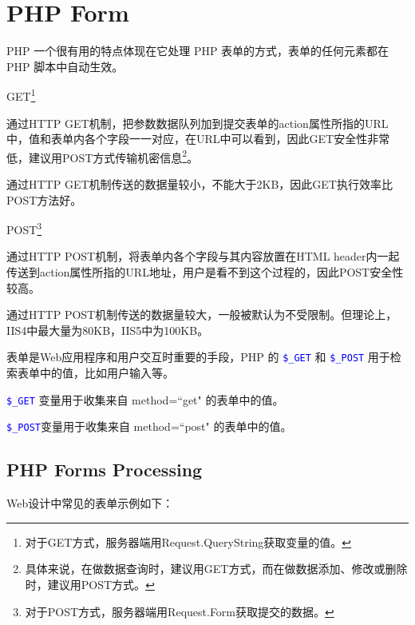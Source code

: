 \part{PHP Form}

PHP 一个很有用的特点体现在它处理 PHP 表单的方式，表单的任何元素都在 PHP 脚本中自动生效。


\begin{compactitem}
\item GET\footnote{对于GET方式，服务器端用Request.QueryString获取变量的值。}

通过HTTP GET机制，把参数数据队列加到提交表单的action属性所指的URL中，值和表单内各个字段一一对应，在URL中可以看到，因此GET安全性非常低，建议用POST方式传输机密信息\footnote{具体来说，在做数据查询时，建议用GET方式，而在做数据添加、修改或删除时，建议用POST方式。}。

通过HTTP GET机制传送的数据量较小，不能大于2KB，因此GET执行效率比POST方法好。

\item POST\footnote{对于POST方式，服务器端用Request.Form获取提交的数据。}

通过HTTP POST机制，将表单内各个字段与其内容放置在HTML header内一起传送到action属性所指的URL地址，用户是看不到这个过程的，因此POST安全性较高。

通过HTTP POST机制传送的数据量较大，一般被默认为不受限制。但理论上，IIS4中最大量为80KB，IIS5中为100KB。
\end{compactitem}




表单是Web应用程序和用户交互时重要的手段，PHP 的 \textcolor{Blue}{\texttt{\$\_GET}} 和 \textcolor{Blue}{\texttt{\$\_POST}} 用于检索表单中的值，比如用户输入等。



\begin{compactitem}
\item \textcolor{Blue}{\texttt{\$\_GET}} 变量用于收集来自 method=``get" 的表单中的值。
\item \textcolor{Blue}{\texttt{\$\_POST}}变量用于收集来自 method=``post" 的表单中的值。
\end{compactitem}





\chapter{PHP Forms Processing}

Web设计中常见的表单示例如下：

